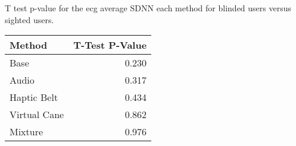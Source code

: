 
\centering
\caption{T test p-value for the ecg average SDNN each method for blinded users versus sighted users.}
\label{tab:ttest_ecg_sdnn}
\begin{tabular}{lr}
\toprule
      Method &  T-Test P-Value \\
\midrule
        Base &           0.230 \\
       Audio &           0.317 \\
 Haptic Belt &           0.434 \\
Virtual Cane &           0.862 \\
     Mixture &           0.976 \\
\bottomrule
\end{tabular}
